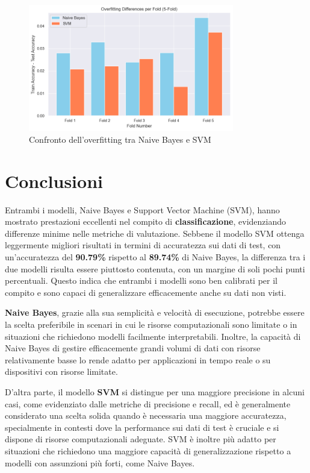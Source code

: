 \begin{figure}[H]
    \centering
    \includegraphics[width=0.8\textwidth]{images/overfitting_differences.png}
    \caption{Confronto dell'overfitting tra Naive Bayes e SVM}
    \label{fig:overfitting_differences}
\end{figure}

\section{Conclusioni}

Entrambi i modelli, Naive Bayes e Support Vector Machine (SVM), hanno mostrato prestazioni eccellenti nel compito di \textbf{classificazione}, evidenziando differenze minime nelle metriche di valutazione. Sebbene il modello SVM ottenga leggermente migliori risultati in termini di accuratezza sui dati di test, con un'accuratezza del \textbf{90.79\%} rispetto al \textbf{89.74\%} di Naive Bayes, la differenza tra i due modelli risulta essere piuttosto contenuta, con un margine di soli pochi punti percentuali. Questo indica che entrambi i modelli sono ben calibrati per il compito e sono capaci di generalizzare efficacemente anche su dati non visti.

\textbf{Naive Bayes}, grazie alla sua semplicità e velocità di esecuzione, potrebbe essere la scelta preferibile in scenari in cui le risorse computazionali sono limitate o in situazioni che richiedono modelli facilmente interpretabili. Inoltre, la capacità di Naive Bayes di gestire efficacemente grandi volumi di dati con risorse relativamente basse lo rende adatto per applicazioni in tempo reale o su dispositivi con risorse limitate.

D'altra parte, il modello \textbf{SVM} si distingue per una maggiore precisione in alcuni casi, come evidenziato dalle metriche di precisione e recall, ed è generalmente considerato una scelta solida quando è necessaria una maggiore accuratezza, specialmente in contesti dove la performance sui dati di test è cruciale e si dispone di risorse computazionali adeguate. SVM è inoltre più adatto per situazioni che richiedono una maggiore capacità di generalizzazione rispetto a modelli con assunzioni più forti, come Naive Bayes.

